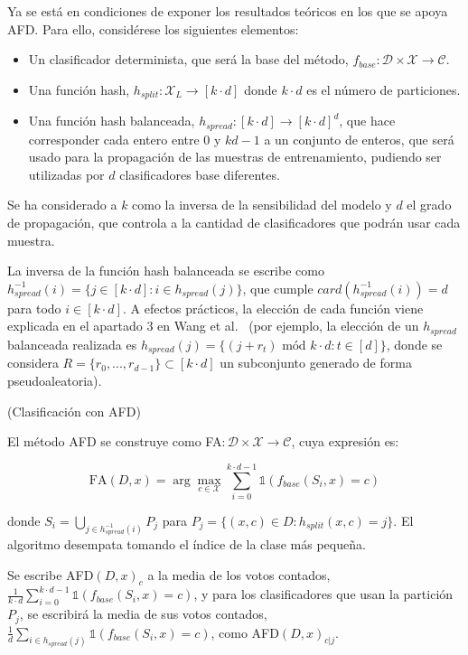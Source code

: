 Ya se está en condiciones de exponer los resultados teóricos en los que se apoya AFD. Para ello, considérese los siguientes elementos:

\begin{itemize}
	\item Un clasificador determinista, que será la base del método, $f_{base}: \mathcal{D} \times \mathcal{X} \to \mathcal{C}$.
	
	\item Una función hash, $h_{split}: \mathcal{X}_L \to [k \cdot d]$ donde $k \cdot d$ es el número de particiones.
	
	\item Una función hash balanceada, $h_{spread}: [k \cdot d] \to [k \cdot d]^d$, que hace corresponder cada entero entre $0$ y $kd-1$ a un conjunto de enteros, que será usado para la propagación de las muestras de entrenamiento, pudiendo ser utilizadas por $d$ clasificadores base diferentes.
\end{itemize}

Se ha considerado a $k$ como la inversa de la sensibilidad del modelo y $d$ el grado de propagación, que controla a la cantidad de clasificadores que podrán usar cada muestra.

La inversa de la función hash balanceada se escribe como $h_{spread}^{-1} (i) = \{j \in [k \cdot d] : i \in h_{spread}(j)\}$, que cumple $card(h_{spread}^{-1} (i)) = d$ para todo $i \in [k \cdot d]$. A efectos prácticos, la elección de cada función viene explicada en el apartado $3$ en Wang et al.~\cite{AgregFinita} (por ejemplo, la elección de un $h_{spread}$ balanceada realizada es  $h_{spread} (j) = \{(j+r_t) \text{ mód } k \cdot d: t\in [d]\}$, donde se considera $R=\{r_0,...,r_{d-1}\} \subset [k \cdot d]$ un subconjunto generado de forma pseudoaleatoria).

\begin{definicion} (Clasificación con AFD)

El método AFD se construye como FA$: \mathcal{D} \times \mathcal{X} \to \mathcal{C}$, cuya expresión es:

$$\text{FA}(D,x) = \arg \max_{c \in \mathcal{X}} \sum_{i=0}^{k \cdot d - 1} \mathbb{1} \left( f_{base}(S_i,x)=c \right)$$

donde $S_i = \bigcup_{j \in h_{spread}^{-1} (i)} P_j$ para $P_j = \{(x,c) \in D : h_{split}(x,c) = j\}$. El algoritmo desempata tomando el índice de la clase más pequeña.
\end{definicion}

Se escribe AFD$(D,x)_c$ a la media de los votos contados, $\frac{1}{k \cdot d} \sum_{i=0}^{k \cdot d - 1} \mathbb{1} \left( f_{base}(S_i,x) = c \right)$, y para los clasificadores que usan la partición $P_j$, se escribirá la media de sus votos contados, $\frac{1}{d} \sum_{i \in h_{spread} (j)} \mathbb{1} \left( f_{base}(S_i,x) = c \right)$, como AFD$(D,x)_{c|j}$.

